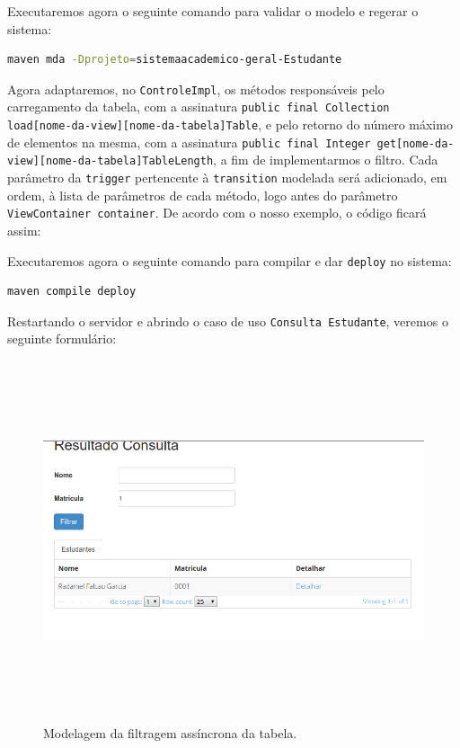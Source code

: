 Executaremos agora o seguinte comando para validar o modelo e regerar o
sistema:
\begin{lstlisting}[language=bash, frame=single, breaklines=true]
maven mda -Dprojeto=sistemaacademico-geral-Estudante
\end{lstlisting}

Agora adaptaremos, no \texttt{ControleImpl}, os métodos responsáveis pelo
carregamento da tabela, com a assinatura \texttt{public final Collection
load[nome-da-view][nome-da-tabela]Table}, e pelo retorno do número máximo de
elementos na mesma, com a assinatura \texttt{public final Integer
get[nome-da-view][nome-da-tabela]TableLength}, a fim de implementarmos o filtro.
Cada parâmetro da \texttt{trigger} pertencente à \texttt{transition} modelada
será adicionado, em ordem, à lista de parâmetros de cada método, logo antes do
parâmetro \texttt{ViewContainer container}. De acordo com o nosso exemplo, o
código ficará assim:


Executaremos agora o seguinte comando para compilar e dar \texttt{deploy} no
sistema:
\begin{lstlisting}[language=bash, frame=single, breaklines=true]
maven compile deploy
\end{lstlisting}

Restartando o servidor e abrindo o caso de uso \texttt{Consulta Estudante},
veremos o seguinte formulário:
\begin{figure}[H]
	\centering
	\includegraphics[width=340pt,height=300pt]{files/imgs/tutorial-mdarte-0042.png}
	\caption{Modelagem da filtragem assíncrona da tabela.}
	\label{modelando_filtragem_assincrona}
\end{figure}